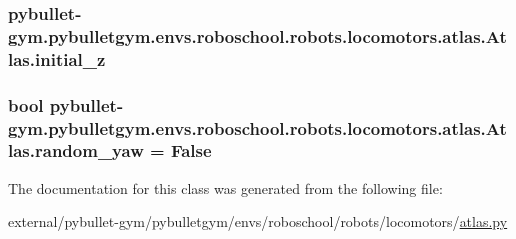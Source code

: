 \subsubsection[{\texorpdfstring{initial\+\_\+z}{initial_z}}]{\setlength{\rightskip}{0pt plus 5cm}pybullet-\/gym.\+pybulletgym.\+envs.\+roboschool.\+robots.\+locomotors.\+atlas.\+Atlas.\+initial\+\_\+z}\hypertarget{classpybullet-gym_1_1pybulletgym_1_1envs_1_1roboschool_1_1robots_1_1locomotors_1_1atlas_1_1_atlas_a039d6e40ded757ef60976149a9e0906c}{}\label{classpybullet-gym_1_1pybulletgym_1_1envs_1_1roboschool_1_1robots_1_1locomotors_1_1atlas_1_1_atlas_a039d6e40ded757ef60976149a9e0906c}
\subsubsection[{\texorpdfstring{random\+\_\+yaw}{random_yaw}}]{\setlength{\rightskip}{0pt plus 5cm}bool pybullet-\/gym.\+pybulletgym.\+envs.\+roboschool.\+robots.\+locomotors.\+atlas.\+Atlas.\+random\+\_\+yaw = False\hspace{0.3cm}{\ttfamily [static]}}\hypertarget{classpybullet-gym_1_1pybulletgym_1_1envs_1_1roboschool_1_1robots_1_1locomotors_1_1atlas_1_1_atlas_a4243fe9f01b9603c4ff55f427c84f277}{}\label{classpybullet-gym_1_1pybulletgym_1_1envs_1_1roboschool_1_1robots_1_1locomotors_1_1atlas_1_1_atlas_a4243fe9f01b9603c4ff55f427c84f277}


The documentation for this class was generated from the following file\+:\begin{DoxyCompactItemize}
\item 
external/pybullet-\/gym/pybulletgym/envs/roboschool/robots/locomotors/\hyperlink{atlas_8py}{atlas.\+py}\end{DoxyCompactItemize}
